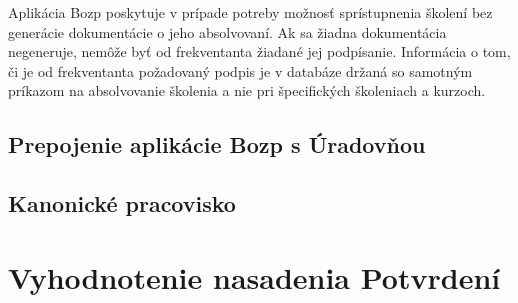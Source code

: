\documentclass[
  digital,     %
  oneside,     %
  nosansbold,  %
  nocolorbold, %
  lof,         %
  nolot,         %
]{fithesis4}
\begin{document}
Aplikácia Bozp poskytuje v prípade potreby možnosť sprístupnenia školení bez generácie dokumentácie o jeho absolvovaní. Ak sa žiadna dokumentácia negeneruje, nemôže byť od frekventanta žiadané jej podpísanie. Informácia o tom, či je od frekventanta požadovaný podpis je v databáze držaná so samotným príkazom na absolvovanie školenia a nie pri špecifických školeniach a kurzoch.







\section{Prepojenie aplikácie Bozp s Úradovňou}
\section{Kanonické pracovisko}

\chapter{Vyhodnotenie nasadenia Potvrdení}

\printbibliography[heading=bibintoc] %
\end{document}
